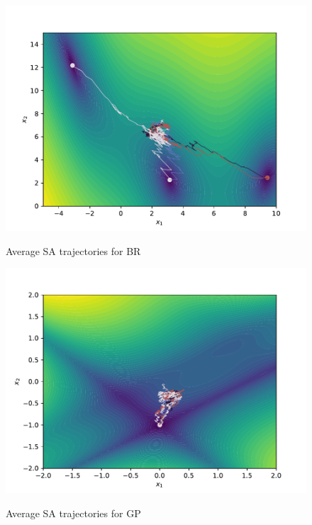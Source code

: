 \begin{figure}
    \centering
    \caption{Average SA trajectories for BR}
    \includegraphics[scale=0.42]{figures/fig51-branin.pdf}
    \label{fig:5.1.1}
\end{figure}

\begin{figure}
    \centering
    \caption{Average SA trajectories for GP}
    \includegraphics[scale=0.42]{figures/fig51-goldstein_price.pdf}
    \label{fig:5.1.2}
\end{figure}

